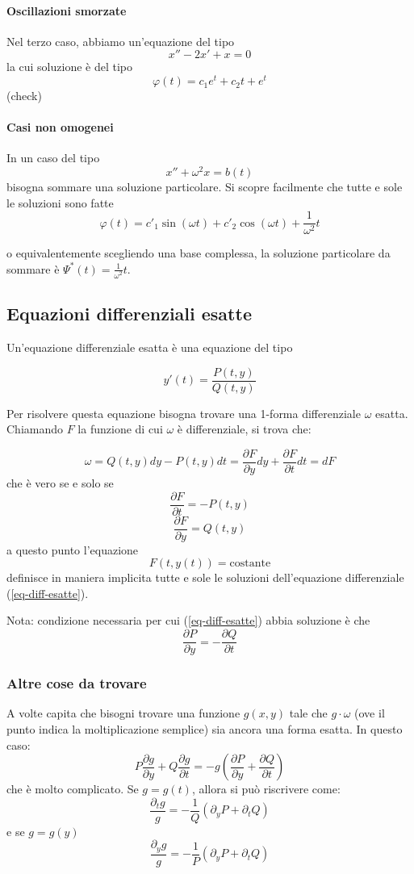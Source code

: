 \documentclass[a4paper,12pt]{article}
\begin{document}
\paragraph{Oscillazioni smorzate}
Nel terzo caso, abbiamo un'equazione del tipo
$$x''-2x' +x=0$$
la cui soluzione è del tipo
$$\varphi(t) = c_1e^t +c_2 t + e^t$$
(check)

\paragraph{Casi non omogenei}
In un caso del tipo
$$x''+\omega^2 x=b(t)$$
bisogna sommare una soluzione particolare. Si scopre facilmente che tutte e sole le soluzioni sono fatte
$$\varphi(t) = c'_1\sin(\omega t) + c'_2\cos(\omega t) + \frac{1}{\omega^2}t$$

o equivalentemente scegliendo una base complessa, la soluzione particolare da sommare è $\Psi^*(t) = \frac{1}{\omega^2}t$.

\subsection{Equazioni differenziali esatte}

Un'equazione differenziale esatta è una equazione del tipo

\begin{equation}\label{eq-diff-esatte}
y'(t)=\frac{P(t, y)}{Q(t,y)} 
\end{equation}

Per risolvere questa equazione bisogna trovare una 1-forma differenziale $\omega$ esatta. Chiamando $F$ la funzione di cui $\omega$ è differenziale, si trova che:

$$\omega = Q(t,y)dy - P(t,y)dt = \frac{\partial F}{\partial y}dy+\frac{\partial F}{\partial t}dt = dF$$
che è vero se e solo se
$$\frac{\partial F}{\partial t}=-P(t,y)$$
$$\frac{\partial F}{\partial y}=Q(t,y)$$
a questo punto l'equazione
$$F(t, y(t)) = \text{costante}$$
definisce in maniera implicita tutte e sole le soluzioni dell'equazione differenziale (\ref{eq-diff-esatte}).

Nota: condizione necessaria per cui (\ref{eq-diff-esatte}) abbia soluzione è che
$$\frac{\partial P}{\partial y}=-\frac{\partial Q}{\partial t}$$

\subsubsection{Altre cose da trovare}
A volte capita che bisogni trovare una funzione $g(x,y)$ tale che $g\cdot\omega$ (ove il punto indica la moltiplicazione semplice) sia ancora una forma esatta. In questo caso:
$$P\frac{\partial g}{\partial y} + Q\frac{\partial g}{\partial t} = -g\left(\frac{\partial P}{\partial y} + \frac{\partial Q}{\partial t}\right)$$
che è molto complicato.
Se $g=g(t)$, allora si può riscrivere come:
$$\frac{\partial_tg}{g} = -\frac{1}{Q}(\partial_yP+\partial_tQ)$$
e se $g=g(y)$
$$\frac{\partial_yg}{g} = -\frac{1}{P}(\partial_yP+\partial_tQ)$$
\end{document}

